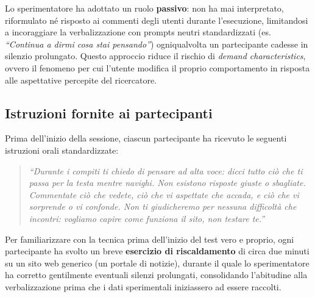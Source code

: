 Lo sperimentatore ha adottato un ruolo \textbf{passivo}: non ha mai interpretato, riformulato né risposto ai commenti degli utenti durante l'esecuzione, limitandosi a incoraggiare la verbalizzazione con prompts neutri standardizzati (es. \textit{``Continua a dirmi cosa stai pensando''}) ogniqualvolta un partecipante cadesse in silenzio prolungato. Questo approccio riduce il rischio di \textit{demand characteristics}, ovvero il fenomeno per cui l'utente modifica il proprio comportamento in risposta alle aspettative percepite del ricercatore.

\subsection{Istruzioni fornite ai partecipanti}
Prima dell'inizio della sessione, ciascun partecipante ha ricevuto le seguenti istruzioni orali standardizzate:

\begin{quote}
\itshape
``Durante i compiti ti chiedo di pensare ad alta voce: dicci tutto ciò che ti passa per la testa mentre navighi. Non esistono risposte giuste o sbagliate. Commentate ciò che vedete, ciò che vi aspettate che accada, e ciò che vi sorprende o vi confonde. Non ti giudicheremo per nessuna difficoltà che incontri: vogliamo capire come funziona il sito, non testare te.''
\end{quote}

Per familiarizzare con la tecnica prima dell'inizio del test vero e proprio, ogni partecipante ha svolto un breve \textbf{esercizio di riscaldamento} di circa due minuti su un sito web generico (un portale di notizie), durante il quale lo sperimentatore ha corretto gentilmente eventuali silenzi prolungati, consolidando l'abitudine alla verbalizzazione prima che i dati sperimentali iniziassero ad essere raccolti.


